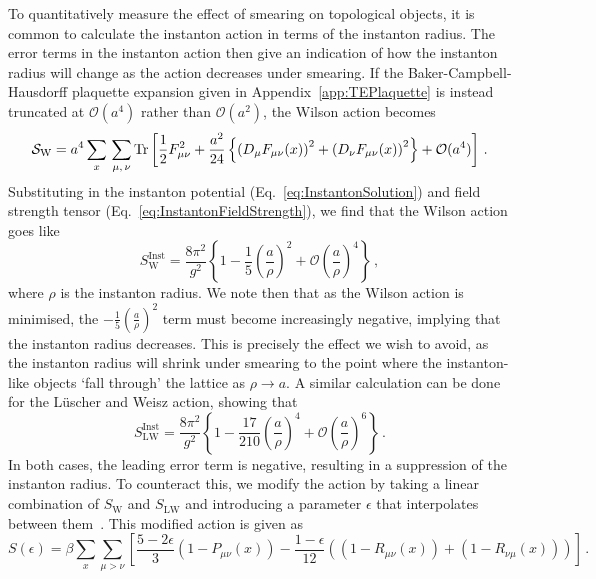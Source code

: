To quantitatively measure the effect of smearing on topological objects, it is common to calculate the instanton action in terms of the instanton radius. The error terms in the instanton action then give an indication of how the instanton radius will change as the action decreases under smearing. If the Baker-Campbell-Hausdorff plaquette expansion given in Appendix~\ref{app:TEPlaquette} is instead truncated at $\mathcal{O}(a^4)$ rather than $\mathcal{O}(a^2)$, the Wilson action becomes~\cite{GarciaPerez:1993lic}
%
\begin{equation}
\mathcal{S}_\text{W} = a^4\sum_x\,\sum_{\mu,\,\nu} \operatorname{Tr}\left[\frac{1}{2}F_{\mu\nu}^2 + \frac{a^2}{24}\left\lbrace \left( D _ { \mu } F _ { \mu \nu } ( x ) \right) ^ { 2 } + \left( D _ { \nu } F _ { \mu \nu } ( x ) \right) ^ { 2 } \right\rbrace + \mathcal{O}(a^4)\right]\, .
\end{equation}
%
Substituting in the instanton potential (Eq.~\ref{eq:InstantonSolution}) and field strength tensor (Eq.~\ref{eq:InstantonFieldStrength}), we find that the Wilson action goes like
%
\begin{equation}
S_\text{W}^\text{Inst} = \frac{8\pi^2}{g^2}\left\{1-\frac{1}{5}\left(\frac{a}{\rho}\right)^2 + \mathcal{O}\left(\frac{a}{\rho}\right)^4 \right\}\, ,
\end{equation}
%
where $\rho$ is the instanton radius. We note then that as the Wilson action is minimised, the $-\frac{1}{5}\left(\frac{a}{\rho}\right)^2$ term must become increasingly negative, implying that the instanton radius decreases. This is precisely the effect we wish to avoid, as the instanton radius will shrink under smearing to the point where the instanton-like objects `fall through' the lattice as $\rho\rightarrow a$. A similar calculation can be done for the L\"uscher and Weisz action, showing that~\cite{GarciaPerez:1993lic}
%
\begin{equation}
S_\text{LW}^\text{Inst} = \frac{8\pi^2}{g^2}\left\{ 1 - \frac { 17 } { 210 } \left(  \frac{a}{\rho} \right) ^ { 4 } + \mathcal { O } \left( \frac{a}{\rho} \right) ^ { 6 } \right\}\, .
\end{equation}
%
In both cases, the leading error term is negative, resulting in a suppression of the instanton radius. To counteract this, we modify the action by taking a linear combination of $S_\text{W}$ and $S_\text{LW}$ and introducing a parameter $\epsilon$ that interpolates between them~\cite{Moran:2008ra}. This modified action is given as
%
\begin{equation}
S ( \epsilon ) =  \beta \sum _ { x } \sum _ { \mu > \nu } \left[ \frac { 5 - 2 \epsilon } { 3 } \left( 1 - P _ { \mu \nu } ( x ) \right) - \frac { 1 - \epsilon } { 12 } \left( \left( 1 - R _ { \mu \nu } ( x ) \right) + \left( 1 - R _ { \nu \mu } ( x ) \right) \right) \right]\, .
\end{equation}
